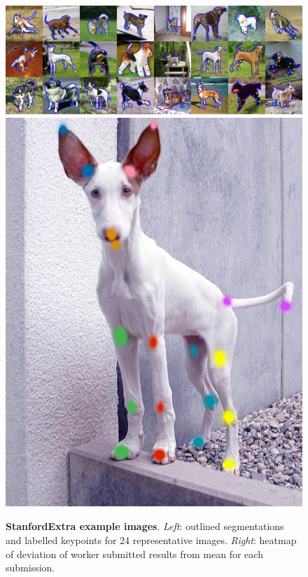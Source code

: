 \begin{figure}[h]
    \centering
    \includegraphics[height=0.1775\textheight]{OllieFigs/collage_wide.png}
    \includegraphics[height=0.1775\textheight]{OllieFigs/heatmap.png}
    \caption{\textbf{StanfordExtra example images}. \emph{Left}: outlined segmentations and labelled keypoints for 24 representative images. \emph{Right}: heatmap of deviation of worker submitted results from mean for each submission.}
    \label{fig:dataset}
\end{figure}

